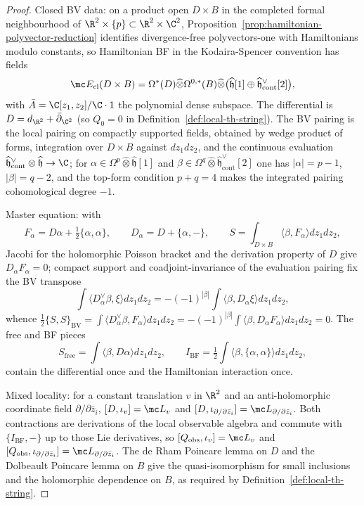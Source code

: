 \documentclass[11pt]{memoir}
\begin{document}
\begin{proof}
  Closed BV data: on a product open \(D\times B\) in the completed formal
  neighbourhood of \(\R^2\times\{p\}\subset\R^2\times\C^2\),
  Proposition~\ref{prop:hamiltonian-polyvector-reduction} identifies
  divergence-free polyvectors-one with Hamiltonians modulo constants, so
  Hamiltonian BF in the Kodaira-Spencer convention has fields
  \[
    \mc E_{\mathrm{cl}}(D\times B)=
      \Omega^*(D)\widehat{\otimes}\Omega^{0,*}(B)\widehat{\otimes}
      \bigl(\widehat{\mathfrak h}[1]\oplus
      \widehat{\mathfrak h}^{\vee}_{\mathrm{cont}}[2]\bigr),
  \]
  with \(\bar A=\C[z_1,z_2]/\C\cdot 1\) the polynomial dense subspace.
  The differential is \(D=d_{\R^2}+\bar\partial_{\C^2}\) (so \(Q_0=0\)
  in Definition~\ref{def:local-th-string}). The BV pairing is the local
  pairing on compactly supported fields, obtained by wedge product of
  forms, integration over \(D\times B\) against \(dz_1dz_2\), and the
  continuous evaluation
  \(\widehat{\mathfrak h}^{\vee}_{\mathrm{cont}}\otimes\widehat{\mathfrak h}\to\C\);
  for
  \(\alpha\in\Omega^p\widehat{\otimes}\widehat{\mathfrak h}[1]\) and
  \(\beta\in\Omega^q\widehat{\otimes}\widehat{\mathfrak h}^{\vee}_{\mathrm{cont}}[2]\)
  one has \(|\alpha|=p-1\), \(|\beta|=q-2\), and the top-form condition
  \(p+q=4\) makes the integrated pairing cohomological degree \(-1\).

  Master equation: with
  \[
    F_\alpha=D\alpha+\tfrac12\{\alpha,\alpha\},\qquad
    D_\alpha=D+\{\alpha,-\},\qquad
    S=\int_{D\times B}\langle\beta,F_\alpha\rangle dz_1dz_2,
  \]
  Jacobi for the holomorphic Poisson bracket and the derivation
  property of \(D\) give \(D_\alpha F_\alpha=0\); compact support and
  coadjoint-invariance of the evaluation pairing fix the BV transpose
  \[
    \int\langle D_\alpha^{\vee}\beta,\xi\rangle dz_1dz_2
    =-(-1)^{|\beta|}\int\langle\beta,D_\alpha\xi\rangle dz_1dz_2,
  \]
  whence \(\tfrac12\{S,S\}_{\mathrm{BV}}=
  \int\langle D_\alpha^{\vee}\beta,F_\alpha\rangle dz_1dz_2
  =-(-1)^{|\beta|}\int\langle\beta,D_\alpha F_\alpha\rangle dz_1dz_2=0\).
  The free and BF pieces
  \[
    S_{\mathrm{free}}=\int\langle\beta,D\alpha\rangle dz_1dz_2,\qquad
    I_{\mathrm{BF}}=\tfrac12\int\langle\beta,\{\alpha,\alpha\}\rangle dz_1dz_2,
  \]
  contain the differential once and the Hamiltonian interaction once.

  Mixed locality: for a constant translation \(v\) in \(\R^2\) and an
  anti-holomorphic coordinate field \(\partial/\partial\bar z_i\),
  \([D,\iota_v]=\mc L_v\) and
  \([D,\iota_{\partial/\partial\bar z_i}]=\mc L_{\partial/\partial\bar z_i}\).
  Both contractions are derivations of the local observable algebra and
  commute with \(\{I_{\mathrm{BF}},-\}\) up to those Lie derivatives, so
  \([Q_{\mathrm{obs}},\iota_v]=\mc L_v\) and
  \([Q_{\mathrm{obs}},\iota_{\partial/\partial\bar z_i}]
  =\mc L_{\partial/\partial\bar z_i}\). The de Rham Poincare lemma on
  \(D\) and the Dolbeault Poincare lemma on \(B\) give the
  quasi-isomorphism for small inclusions and the holomorphic dependence
  on \(B\), as required by Definition~\ref{def:local-th-string}.


\end{proof}
\end{document}
